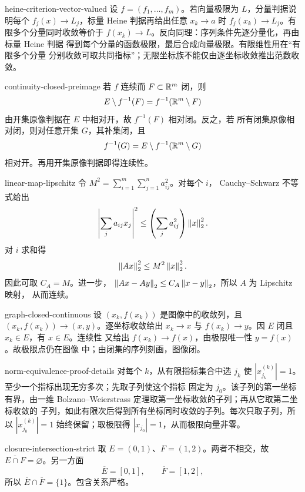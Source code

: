 \begin{solution}{heine-criterion-vector-valued}
设 \(f=(f_1,\ldots,f_m)\)。若向量极限为 \(L\)，分量判据说明每个
\(f_j(x)\to L_j\)，标量 Heine 判据再给出任意 \(x_k\to a\) 时
\(f_j(x_k)\to L_j\)。有限多个分量同时收敛等价于
\(f(x_k)\to L\)。反向同理：序列条件先逐分量化，再由标量 Heine 判据
得到每个分量的函数极限，最后合成向量极限。有限维性用在“有限多个分量
分别收敛可取共同指标”；无限坐标族不能仅由逐坐标收敛推出范数收敛。
\end{solution}

\begin{solution}{continuity-closed-preimage}
若 \(f\) 连续而 \(F\subset\mathbb{R}^m\) 闭，则
\[
 E\setminus f^{-1}(F)=f^{-1}(\mathbb{R}^m\setminus F)
\]
由开集原像判据在 \(E\) 中相对开，故 \(f^{-1}(F)\) 相对闭。反之，若
所有闭集原像相对闭，则对任意开集 \(G\)，其补集闭，且
\[
 f^{-1}(G)=E\setminus f^{-1}(\mathbb{R}^m\setminus G)
\]
相对开。再用开集原像判据即得连续性。
\end{solution}

\begin{solution}{linear-map-lipschitz}
令 \(M^2=\sum_{i=1}^m\sum_{j=1}^na_{ij}^2\)。对每个 \(i\)，
Cauchy--Schwarz 不等式给出
\[
 \left|\sum_ja_{ij}x_j\right|^2
 \le\left(\sum_ja_{ij}^2\right)\left\lVert x\right\rVert_2^2.
\]
对 \(i\) 求和得
\[
 \left\lVert Ax\right\rVert_2^2\le M^2\left\lVert x\right\rVert_2^2.
\]
因此可取 \(C_A=M\)。进一步，
\(\left\lVert Ax-Ay\right\rVert_2\le C_A\left\lVert x-y\right\rVert_2\)，所以 \(A\) 为 Lipschitz 映射，
从而连续。
\end{solution}

\begin{solution}{graph-closed-continuous}
设 \((x_k,f(x_k))\) 是图像中的收敛列，且
\((x_k,f(x_k))\to(x,y)\)。逐坐标收敛给出 \(x_k\to x\) 与
\(f(x_k)\to y\)。因 \(E\) 闭且 \(x_k\in E\)，有 \(x\in E\)。连续性
又给出 \(f(x_k)\to f(x)\)，由极限唯一性 \(y=f(x)\)。故极限点仍在图像
中；由闭集的序列刻画，图像闭。
\end{solution}

\begin{solution}{norm-equivalence-proof-details}
对每个 \(k\)，从有限指标集合中选 \(j_k\) 使
\(|x_{j_k}^{(k)}|=1\)。至少一个指标出现无穷多次；先取子列使这个指标
固定为 \(j_0\)。该子列的第一坐标有界，由一维
Bolzano--Weierstrass 定理取第一坐标收敛的子列；再从它取第二坐标收敛的
子列，如此有限次后得到所有坐标同时收敛的子列。每次只取子列，所以
\(|x_{j_0}^{(k)}|=1\) 始终保留；取极限得
\(|x_{j_0}|=1\)，从而极限向量非零。
\end{solution}

\begin{solution}{closure-intersection-strict}
取 \(E=(0,1)\)、\(F=(1,2)\)。两者不相交，故
\(\overline{E\cap F}=\varnothing\)。另一方面
\[
 \overline E=[0,1],\qquad \overline F=[1,2],
\]
所以 \(\overline E\cap\overline F=\{1\}\)。包含关系严格。
\end{solution}

